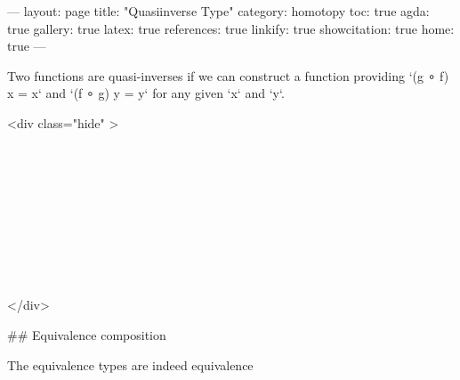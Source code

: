 ---
layout: page
title: "Quasiinverse Type"
category: homotopy
toc: true
agda: true
gallery: true
latex: true
references: true
linkify: true
showcitation: true
home: true
---

Two functions are quasi-inverses if we can construct a function providing
`(g ∘ f) x = x` and `(f ∘ g) y = y` for any given `x` and `y`.

<div class="hide" >
\begin{code}%
\>[0]\AgdaSymbol{\{-\#}\AgdaSpace{}%
\AgdaSpace{}%
\AgdaSpace{}%
\AgdaSymbol{\#-\}}\<%
\\
\>[0]\AgdaSpace{}%
\AgdaSpace{}%
\<%
\\
\>[0]\AgdaSpace{}%
\AgdaSpace{}%
\<%
\\
%
\\[\AgdaEmptyExtraSkip]%
\>[0]\AgdaSpace{}%
\AgdaSpace{}%
\<%
\\
\>[0]\AgdaSpace{}%
\AgdaSpace{}%
\<%
\\
%
\\[\AgdaEmptyExtraSkip]%
\>[0]\AgdaSpace{}%
\AgdaSpace{}%
\<%
\\
\>[0]\AgdaSpace{}%
\AgdaSpace{}%
\<%
\end{code}
</div>

## Equivalence composition

\begin{code}%
\>[0]\AgdaSpace{}%
\AgdaSpace{}%
\<%
\end{code}

The equivalence types are indeed equivalence

